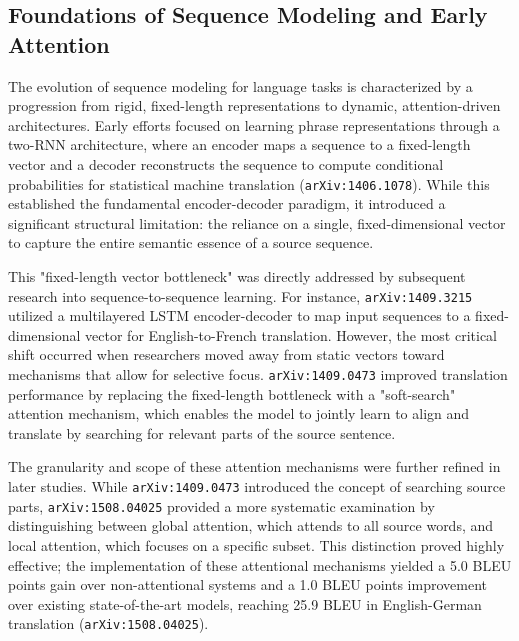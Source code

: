 \documentclass[11pt]{article}
\begin{document}
\subsection{Foundations of Sequence Modeling and Early Attention}

The evolution of sequence modeling for language tasks is characterized by a progression from rigid, fixed-length representations to dynamic, attention-driven architectures. Early efforts focused on learning phrase representations through a two-RNN architecture, where an encoder maps a sequence to a fixed-length vector and a decoder reconstructs the sequence to compute conditional probabilities for statistical machine translation (\texttt{arXiv:1406.1078}). While this established the fundamental encoder-decoder paradigm, it introduced a significant structural limitation: the reliance on a single, fixed-dimensional vector to capture the entire semantic essence of a source sequence.

This "fixed-length vector bottleneck" was directly addressed by subsequent research into sequence-to-sequence learning. For instance, \texttt{arXiv:1409.3215} utilized a multilayered LSTM encoder-decoder to map input sequences to a fixed-dimensional vector for English-to-French translation. However, the most critical shift occurred when researchers moved away from static vectors toward mechanisms that allow for selective focus. \texttt{arXiv:1409.0473} improved translation performance by replacing the fixed-length bottleneck with a "soft-search" attention mechanism, which enables the model to jointly learn to align and translate by searching for relevant parts of the source sentence.

The granularity and scope of these attention mechanisms were further refined in later studies. While \texttt{arXiv:1409.0473} introduced the concept of searching source parts, \texttt{arXiv:1508.04025} provided a more systematic examination by distinguishing between global attention, which attends to all source words, and local attention, which focuses on a specific subset. This distinction proved highly effective; the implementation of these attentional mechanisms yielded a 5.0 BLEU points gain over non-attentional systems and a 1.0 BLEU points improvement over existing state-of-the-art models, reaching 25.9 BLEU in English-German translation (\texttt{arXiv:1508.04025}).
\end{document}
